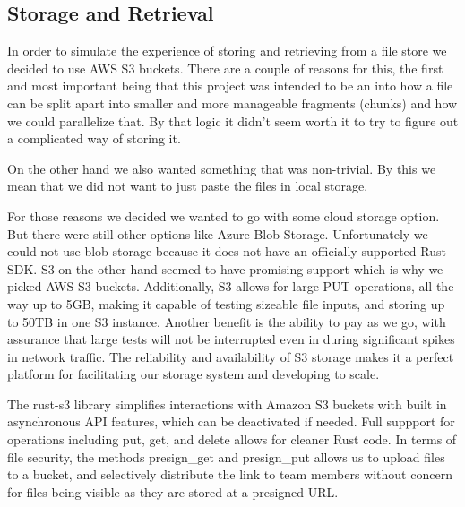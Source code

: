 \documentclass[conference]{IEEEtran}
\begin{document}
\subsection{Storage and Retrieval}

In order to simulate the experience of storing and retrieving from a file store we decided to use AWS S3 buckets.
There are a couple of reasons for this, the first and most important being that this project was intended to be an
into how a file can be split apart into smaller and more manageable fragments (chunks) and how we could parallelize that.
By that logic it didn't seem worth it to try to figure out a complicated way of storing it.

On the other hand we also wanted something that was non-trivial.
By this we mean that we did not want to just paste the files in local storage. 

For those reasons we decided we wanted to go with some cloud storage option.
But there were still other options like Azure Blob Storage.
Unfortunately we could not use blob storage because it does not have an officially supported Rust SDK.
S3 on the other hand seemed to have promising support which is why we picked AWS S3 buckets. Additionally, S3 allows for
large PUT operations, all the way up to 5GB, making it capable of testing sizeable file inputs, and storing up to 50TB in 
one S3 instance. Another benefit is the ability to pay as we go, with assurance that large tests will not be interrupted 
even in during significant spikes in network traffic. The reliability and availability of S3 storage makes it a perfect 
platform for facilitating our storage system and developing to scale. 

The rust-s3 library simplifies interactions with Amazon S3 buckets with built in asynchronous API features, 
which can be deactivated if needed. Full suppport for operations including put, get, and delete allows for 
cleaner Rust code. In terms of file security, the methods presign\_get and presign\_put allows us to upload files
to a bucket, and selectively distribute the link to team members without concern for files being visible as
they are stored at a presigned URL. 
\end{document}
